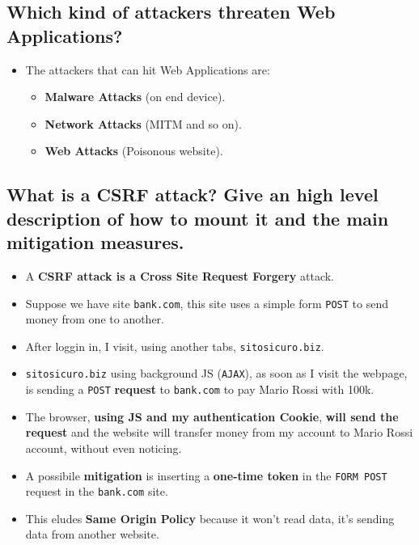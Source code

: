 \documentclass[9pt, letterpaper]{article}
\begin{document}
\subsection{Which kind of attackers threaten Web Applications?}
\begin{itemize}
	\item The attackers that can hit Web Applications are:
	      \begin{itemize}
		      \item \textbf{Malware Attacks} (on end device).
		      \item \textbf{Network Attacks} (MITM and so on).
		      \item \textbf{Web Attacks} (Poisonous website).
	      \end{itemize}
\end{itemize}

\subsection{What is a CSRF attack? Give an high level description of how to mount it and the main mitigation measures.}
\begin{itemize}
	\item A \textbf{CSRF attack is a Cross Site Request Forgery} attack.
	\item Suppose we have site {\tt bank.com}, this site uses a simple form {\tt POST} to send money from one to another.
	\item After loggin in, I visit, using another tabs, {\tt sitosicuro.biz}.
	\item {\tt sitosicuro.biz} using background JS ({\tt AJAX}), as soon as I visit the webpage, is sending a {\tt POST} \textbf{request} to {\tt bank.com} to pay Mario Rossi with 100k.
	\item The browser, \textbf{using JS and my authentication Cookie}, \textbf{will send the request} and the website will transfer money from my account to Mario Rossi account, without even noticing.
	\item A possibile \textbf{mitigation} is inserting a \textbf{one-time token} in the {\tt FORM POST} request in the {\tt bank.com} site.
	\item This eludes \textbf{Same Origin Policy} because it won't read data, it's sending data from another website.
\end{itemize}
\end{document}
